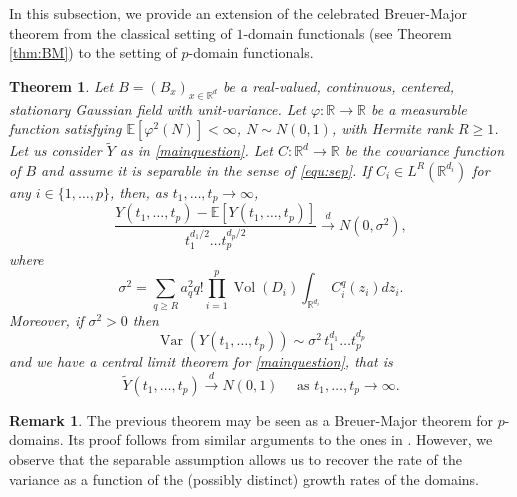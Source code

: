 \documentclass[12pt]{article}
\DeclareMathOperator{\var}{Var}
\DeclareMathOperator{\1}{1}
\DeclareMathOperator{\vol}{Vol}
\newcommand{\R}{\mathbb{R}}
\newcommand{\E}{\mathbb{E}}
\newcommand{\f}{\varphi}
\newcommand{\os}[2]{\overset{#1}{#2}}
\theoremstyle{plain}
\newtheorem{theorem}{Theorem}
\theoremstyle{definition}
\newtheorem{remark}{Remark}
\begin{document}
In this subsection, we provide an extension of the celebrated Breuer-Major theorem from the classical setting of $1$-domain functionals (see Theorem \ref{thm:BM}) to the setting of $p$-domain functionals.
\begin{theorem}\label{thm:BMpdom}
    Let $B=(B_x)_{x\in\R^d}$ be a real-valued, continuous, centered, stationary Gaussian field with unit-variance. Let $\f:\R \rightarrow \R$ be a measurable function  satisfying $\E[\varphi^2(N)]<\infty$, $N\sim N(0,1)$, with Hermite rank $R\ge 1$. Let us consider $\widetilde Y$ as in \eqref{mainquestion}. Let $C:\R^d \rightarrow \R$ be the covariance function of $B$ and assume it is separable in the sense of \eqref{equ:sep}. If $C_i\in L^R(\R^{d_i})$ for any $i\in\{1,\ldots,p\}$, then, as $t_1,\ldots,t_p\to\infty$,
        \begin{equation}
        \frac{Y(t_1,\ldots,t_p)-\E[Y(t_1,\ldots,t_p)]}{t_1^{d_1/2}\ldots t_p^{d_p/2}} \os{d}{\rightarrow} N(0,\sigma^2),
        \end{equation}
    where  \begin{equation}
            \sigma^2 = \sum_{q\ge R} a_q^2 q!  \prod_{i=1}^p \vol(D_i)\int_{\R^{d_i}} C_i^q(z_i) dz_i.
        \end{equation}
    Moreover, if $\sigma^2>0$ then 
    \begin{equation}
        \var(Y(t_1,\ldots,t_p)) \sim \sigma^2\,t_1^{d_1}\ldots t_p^{d_p}
    \end{equation}
    and we have a central limit theorem for \eqref{mainquestion}, that is
    \[
    \widetilde{Y}(t_1,\dots,t_p)\os{d}{\rightarrow} N(0,1) \quad \text{ as }t_1,\ldots,t_p\rightarrow\infty.
    \]
\end{theorem}
\begin{remark}
The previous theorem may be seen as a Breuer-Major theorem for $p$-domains. Its proof follows from similar arguments to the ones in \cite[Theorem 7.2.4]{bluebook}. However, we observe that the separable assumption allows us to recover the rate of the variance as a function of the (possibly distinct) growth rates of the domains. 
\end{remark} 
\end{document}

